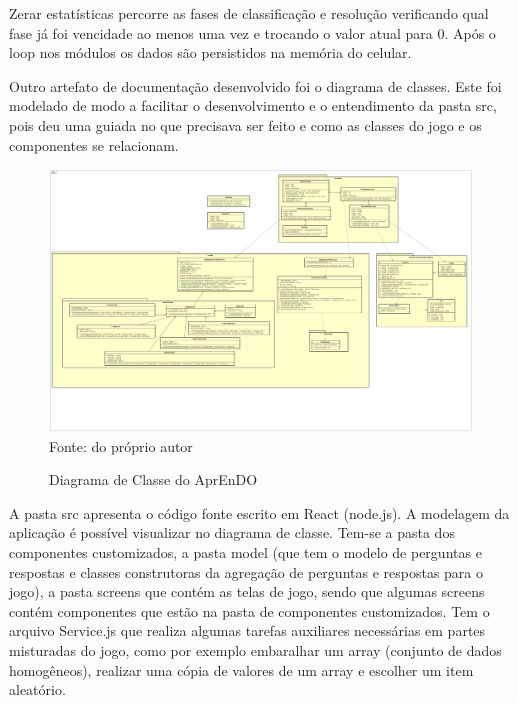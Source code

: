 Zerar estatísticas percorre as fases de classificação e resolução verificando qual fase já foi vencidade ao menos uma vez e trocando o valor atual para 0. Após o loop nos módulos os dados são persistidos na memória do celular.

Outro artefato de documentação desenvolvido foi o diagrama de classes. Este foi modelado de modo a facilitar o desenvolvimento e o entendimento da pasta src, pois deu uma guiada no que precisava ser feito e como as classes do jogo e os componentes se relacionam. 

\begin{figure}[H]
\centering
\caption{Diagrama de Classe do AprEnDO}
\includegraphics[width=\textwidth,height=\textheight,keepaspectratio]{figuras/DC_novo2.png}
\small{Fonte: do próprio autor}
\end{figure}

A pasta src apresenta o código fonte escrito em React (node.js).
A modelagem da aplicação é possível visualizar no diagrama de classe. Tem-se a pasta dos componentes customizados, a pasta model (que tem o modelo de perguntas e respostas e classes construtoras da agregação de perguntas e respostas para o jogo),  a pasta screens que contém as telas de jogo, sendo que algumas screens contém componentes que estão na pasta de componentes customizados. Tem o arquivo Service.js que realiza algumas tarefas auxiliares necessárias em partes misturadas do jogo, como por exemplo embaralhar um array (conjunto de dados homogêneos), realizar uma cópia de valores de um array e escolher um item aleatório.

